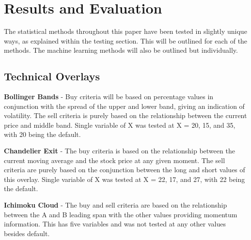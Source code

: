 \documentclass[conference]{IEEEtran}
\begin{document}
\section{Results and Evaluation}

The statistical methods throughout this paper have been tested in slightly unique ways, as explained within the testing section. This will be outlined for each of the methods. The machine learning methods will also be outlined but individually.\\

\subsection{Technical Overlays}

\textbf{Bollinger Bands} - Buy criteria will be based on percentage values in conjunction with the spread of the upper and lower band, giving an indication of volatility. The sell criteria is purely based on the relationship between the current price and middle band. Single variable of X was tested at X = 20, 15, and 35, with 20 being the default.

\textbf{Chandelier Exit} - The buy criteria is based on the relationship between the current moving average and the stock price at any given moment. The sell criteria are purely based on the conjunction between the long and short values of this overlay. Single variable of X was tested at X = 22, 17, and 27, with 22 being the default.

\textbf{Ichimoku Cloud} - The buy and sell criteria are based on the relationship between the A and B leading span with the other values providing momentum information. This has five variables and was not tested at any other values besides default.
\end{document}
